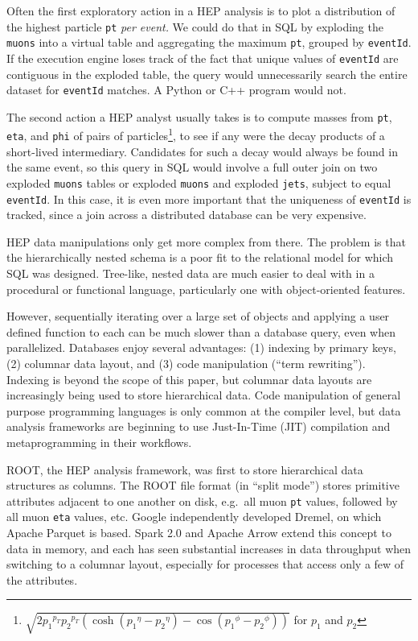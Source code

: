 \documentclass[10pt, conference, compsocconf]{IEEEtran}
\begin{document}
\vspace{0.15 cm}
\noindent Often the first exploratory action in a HEP analysis is to plot a distribution of the highest particle {\tt\small pt} {\it per event.} We could do that in SQL by exploding the {\tt\small muons} into a virtual table and aggregating the maximum {\tt\small pt}, grouped by {\tt\small eventId}. If the execution engine loses track of the fact that unique values of {\tt\small eventId} are contiguous in the exploded table, the query would unnecessarily search the entire dataset for {\tt\small eventId} matches. A Python or C++ program would not.

The second action a HEP analyst usually takes is to compute masses from {\tt\small pt}, {\tt\small eta}, and {\tt\small phi} of pairs of particles\footnote{$\sqrt{2 {p_1}^{p_T} {p_2}^{p_T} (\cosh({p_1}^\eta - {p_2}^\eta) - \cos({p_1}^\phi - {p_2}^\phi))}$ for $p_1$ and $p_2$}, to see if any were the decay products of a short-lived intermediary. Candidates for such a decay would always be found in the same event, so this query in SQL would involve a full outer join on two exploded {\tt\small muons} tables or exploded {\tt\small muons} and exploded {\tt\small jets}, subject to equal {\tt\small eventId}. In this case, it is even more important that the uniqueness of {\tt\small eventId} is tracked, since a join across a distributed database can be very expensive.

HEP data manipulations only get more complex from there. The problem is that the hierarchically nested schema is a poor fit to the relational model for which SQL was designed. Tree-like, nested data are much easier to deal with in a procedural or functional language, particularly one with object-oriented features.

However, sequentially iterating over a large set of objects and applying a user defined function to each can be much slower than a database query, even when parallelized. Databases enjoy several advantages: (1) indexing by primary keys, (2) columnar data layout, and (3) code manipulation (``term rewriting''). Indexing is beyond the scope of this paper, but columnar data layouts are increasingly being used to store hierarchical data. Code manipulation of general purpose programming languages is only common at the compiler level, but data analysis frameworks are beginning to use Just-In-Time (JIT) compilation and metaprogramming in their workflows.

ROOT\cite{root}, the HEP analysis framework, was first to store hierarchical data structures as columns. The ROOT file format (in ``split mode'') stores primitive attributes adjacent to one another on disk, e.g.\ all muon {\tt\small pt} values, followed by all muon {\tt\small eta} values, etc. Google independently developed Dremel\cite{dremel}, on which Apache Parquet is based. Spark 2.0 and Apache Arrow extend this concept to data in memory, and each has seen substantial increases in data throughput when switching to a columnar layout, especially for processes that access only a few of the attributes.
\end{document}
